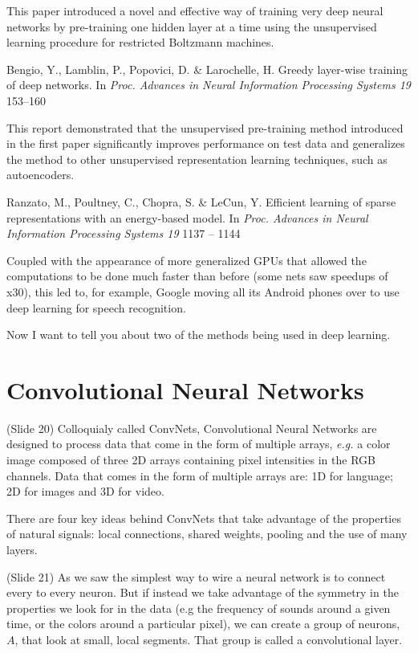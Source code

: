 \documentclass[twocolumn]{article}
\begin{document}
This paper introduced a novel and effective way of training very deep neural
networks by pre-training one hidden layer at a time using the unsupervised
learning procedure for restricted Boltzmann machines.

Bengio, Y., Lamblin, P., Popovici, D. \& Larochelle, H. Greedy layer-wise
training of deep networks. In \textit{Proc. Advances in Neural Information
Processing Systems 19} 153–160

This report demonstrated that the unsupervised pre-training method
introduced in the first paper significantly improves performance on test data
and generalizes the method to other unsupervised representation learning
techniques, such as autoencoders.

Ranzato, M., Poultney, C., Chopra, S. \& LeCun, Y. Efficient learning of sparse
representations with an energy-based model. In \textit{Proc. Advances in Neural
Information Processing Systems 19} 1137 – 1144

Coupled with the appearance of more generalized GPUs that allowed the
computations to be done much faster than before (some nets saw speedups of x30),
this led to, for example, Google moving all its Android phones over to use deep
learning for speech recognition.

Now I want to tell you about two of the methods being used in deep learning.

\section{Convolutional Neural Networks}
(Slide 20) Colloquialy called ConvNets, Convolutional Neural Networks are
designed to process data that come in the form of multiple arrays, \textit{e.g.}
a color image composed of three 2D arrays containing pixel intensities in the
RGB channels. Data that comes in the form of multiple arrays are: 1D for
language; 2D for images and 3D for video.

There are four key ideas behind ConvNets that take advantage of the properties
of natural signals: local connections, shared weights, pooling and the use of
many layers.

(Slide 21) As we saw the simplest way to wire a neural network is to connect
every to every neuron. But if instead we take advantage of the symmetry in the
properties we look for in the data (e.g the frequency of sounds around a given
time, or the colors around a particular pixel), we can create a group of
neurons, \(A\), that look at small, local segments. That group is called a
convolutional layer.
\end{document}
